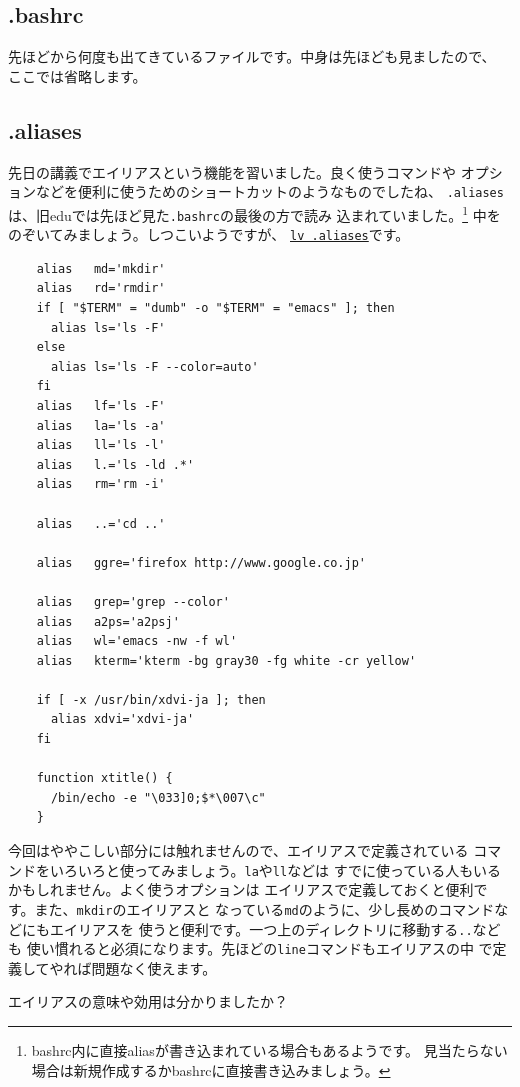 \documentclass[a4j]{ltjsreport}
\begin{document}
    \subsection{.bashrc}
    先ほどから何度も出てきているファイルです。中身は先ほども見ましたので、
    ここでは省略します。

    \subsection{.aliases}
    先日の講義でエイリアスという機能を習いました。良く使うコマンドや
    オプションなどを便利に使うためのショートカットのようなものでしたね、
    \verb+.aliases+は、旧eduでは先ほど見た\verb+.bashrc+の最後の方で読み
    込まれていました。\footnote{bashrc内に直接aliasが書き込まれている場合もあるようです。
    見当たらない場合は新規作成するかbashrcに直接書き込みましょう。}
    中をのぞいてみましょう。しつこいようですが、
    \underline{\texttt{lv .aliases}}です。
    \begin{verbatim}
    alias	md='mkdir'
    alias	rd='rmdir'
    if [ "$TERM" = "dumb" -o "$TERM" = "emacs" ]; then
      alias	ls='ls -F'
    else
      alias	ls='ls -F --color=auto'
    fi
    alias	lf='ls -F'
    alias	la='ls -a'
    alias	ll='ls -l'
    alias	l.='ls -ld .*'
    alias	rm='rm -i'

    alias   ..='cd ..'

    alias   ggre='firefox http://www.google.co.jp'

    alias	grep='grep --color'
    alias	a2ps='a2psj'
    alias	wl='emacs -nw -f wl'
    alias	kterm='kterm -bg gray30 -fg white -cr yellow'

    if [ -x /usr/bin/xdvi-ja ]; then
      alias	xdvi='xdvi-ja'
    fi

    function xtitle() {
      /bin/echo -e "\033]0;$*\007\c"
    }
    \end{verbatim}

    今回はややこしい部分には触れませんので、エイリアスで定義されている
    コマンドをいろいろと使ってみましょう。\verb+la+や\verb+ll+などは
    すでに使っている人もいるかもしれません。よく使うオプションは
    エイリアスで定義しておくと便利です。また、\verb+mkdir+のエイリアスと
    なっている\verb+md+のように、少し長めのコマンドなどにもエイリアスを
    使うと便利です。一つ上のディレクトリに移動する\verb+..+なども
    使い慣れると必須になります。先ほどの\verb+line+コマンドもエイリアスの中
    で定義してやれば問題なく使えます。

    エイリアスの意味や効用は分かりましたか？
\end{document}
